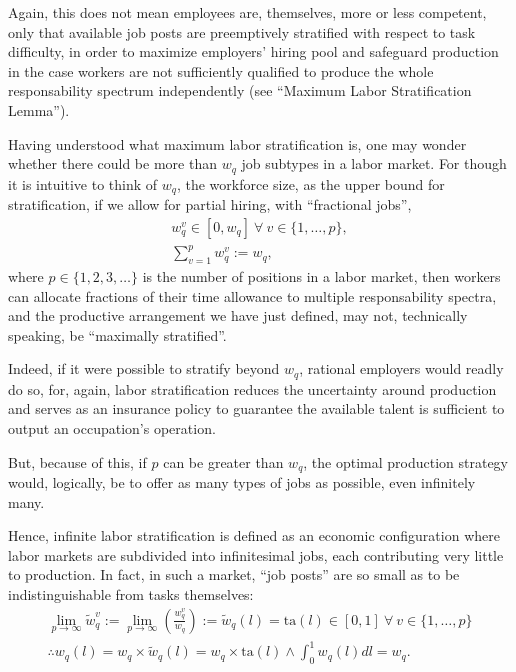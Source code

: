 \documentclass[hidelinks, nonatbib]{elsarticle}
\begin{document}
\begin{definition}
    Again, this does not mean employees are, themselves, more or less competent, only that available job posts are preemptively stratified with respect to task difficulty, in order to maximize employers' hiring pool and safeguard production in the case workers are not sufficiently qualified to produce the whole responsability spectrum independently (see ``Maximum Labor Stratification Lemma'').    
\end{definition}
Having understood what maximum labor stratification is, one may wonder whether there could be more than $w_q$ job subtypes in a labor market. For though it is intuitive to think of $w_q$, the workforce size, as the upper bound for stratification, if we allow for partial hiring, with ``fractional jobs'',
\begin{gather}
w_{q}^{v} 
\in 
[0, w_q]
\
\forall
\
v \in \{1, \dots, p\}
,
\\
\sum_{v=1}^{p}
w_{q}^{v}
:=
w_q
,
\end{gather}
where $p \in \{1, 2, 3, \dots\}$ is the number of positions in a labor market, then workers can allocate fractions of their time allowance to multiple responsability spectra, and the productive arrangement we have just defined, may not, technically speaking, be ``maximally stratified''. 

Indeed, if it were possible to stratify beyond $w_q$, rational employers would readly do so, for, again, labor stratification reduces the uncertainty around production and serves as an insurance policy to guarantee the available talent is sufficient to output an occupation's operation.

But, because of this, if $p$ can be greater than $w_q$, the optimal production strategy would, logically, be to offer as many types of jobs as possible, even infinitely many.

Hence, infinite labor stratification is defined as an economic configuration where labor markets are subdivided into infinitesimal jobs, each contributing very little to production. In fact, in such a market, ``job posts'' are so small as to be indistinguishable from tasks themselves:
\begin{gather}
    \lim_{p \rightarrow \infty}{
        \tilde{w}_{q}^{v}
    }
    := 
    \lim_{p \rightarrow \infty}{
        \left(
            \frac{
                w_{q}^{v}
            }{
                w_q
            }
        \right)
    }
    :=
    \tilde{w}_{q}(l)
    =
    \text{ta}(l)
    \in [0,1]
    \
    \forall
    \
    v \in \{1, \dots, p\}
    \\
    \therefore
    w_{q}(l)
    = 
    w_q \times \tilde{w}_{q}(l)
    =
    w_q \times \text{ta}(l)
    \land
    \int_{0}^{1}{
        w_{q}(l)
        dl
    }
    =
    w_q
    .
    \end{gather}
    
\end{document}
